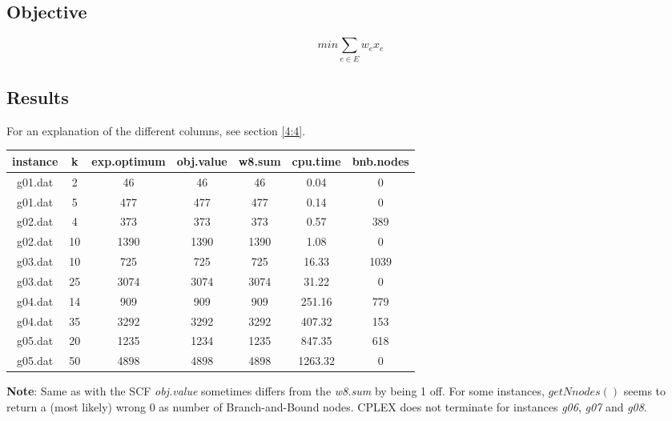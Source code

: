 \subsection{Objective}

\[ min \sum_{e \in E}w_ex_e \]

\subsection{Results}

For an explanation of the different columns, see section \ref{4:4}.

\vspace{0.5cm}

\begin{tabular}{ c | c | c | c | c | c | c }
	instance & k & exp.optimum & obj.value & w8.sum & cpu.time & bnb.nodes \\ 
	\hline
	g01.dat & 2 & 46 & 46 & 46 & 0.04 & 0 \\
	g01.dat & 5 & 477 & 477 & 477 & 0.14 & 0 \\
	g02.dat & 4 & 373 & 373 & 373 & 0.57 & 389 \\
	g02.dat & 10 & 1390 & 1390 & 1390 & 1.08 & 0 \\
	g03.dat & 10 & 725 & 725 & 725 & 16.33 & 1039 \\
	g03.dat & 25 & 3074 & 3074 & 3074 & 31.22 & 0 \\
	g04.dat & 14 & 909 & 909 & 909 & 251.16 & 779 \\
	g04.dat & 35 & 3292 & 3292 & 3292 & 407.32 & 153 \\
	g05.dat & 20 & 1235 & 1234 & 1235 & 847.35 & 618 \\
	g05.dat & 50 & 4898 & 4898 & 4898 & 1263.32 & 0 \\
\end{tabular}

\vspace{0.5cm}

\textbf{Note}: Same as with the SCF \textit{obj.value} sometimes differs from the \textit{w8.sum} by being 1 off. For some instances, $getNnodes()$ seems to return a (most likely) wrong 0 as number of Branch-and-Bound nodes. CPLEX does not terminate for instances \textit{g06}, \textit{g07} and \textit{g08}.

